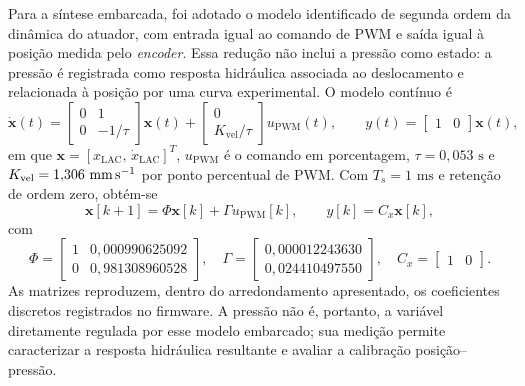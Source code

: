 Para a síntese embarcada, foi adotado o modelo identificado de segunda ordem da dinâmica do atuador, com entrada igual ao comando de \gls{PWM} e saída igual à posição medida pelo \textit{encoder}. Essa redução não inclui a pressão como estado: a pressão é registrada como resposta hidráulica associada ao deslocamento e relacionada à posição por uma curva experimental. O modelo contínuo é
\begin{equation}
    \dot{\mathbf{x}}(t) =
    \begin{bmatrix}
        0 & 1 \\
        0 & -1/\tau
    \end{bmatrix}\mathbf{x}(t)
    +
    \begin{bmatrix}
        0 \\
        K_{\mathrm{vel}}/\tau
    \end{bmatrix}u_{\mathrm{PWM}}(t),
    \qquad
    y(t) = \begin{bmatrix}1 & 0\end{bmatrix}\mathbf{x}(t),
    \label{eq:modelo_reduzido_lac_continuo}
\end{equation}
em que $\mathbf{x}=[x_{\mathrm{LAC}},\,\dot{x}_{\mathrm{LAC}}]^T$, $u_{\mathrm{PWM}}$ é o comando em porcentagem, $\tau=0{,}053\text{ s}$ e $K_{\mathrm{vel}}=1{,}306\text{ mm\,s}^{-1}$ por ponto percentual de PWM. Com $T_s=1\text{ ms}$ e retenção de ordem zero, obtém-se
\begin{equation}
    \mathbf{x}[k+1]=\Phi\mathbf{x}[k]+\Gamma u_{\mathrm{PWM}}[k],
    \qquad y[k]=C_x\mathbf{x}[k],
    \label{eq:modelo_reduzido_lac_discreto}
\end{equation}
com
\begin{equation}
    \Phi =
    \begin{bmatrix}
        1 & 0{,}000990625092 \\
        0 & 0{,}981308960528
    \end{bmatrix},
    \quad
    \Gamma =
    \begin{bmatrix}
        0{,}000012243630 \\
        0{,}024410497550
    \end{bmatrix},
    \quad C_x=\begin{bmatrix}1&0\end{bmatrix}.
    \label{eq:matrizes_lac_firmware}
\end{equation}
As matrizes reproduzem, dentro do arredondamento apresentado, os coeficientes discretos registrados no firmware. A pressão não é, portanto, a variável diretamente regulada por esse modelo embarcado; sua medição permite caracterizar a resposta hidráulica resultante e avaliar a calibração posição--pressão.


